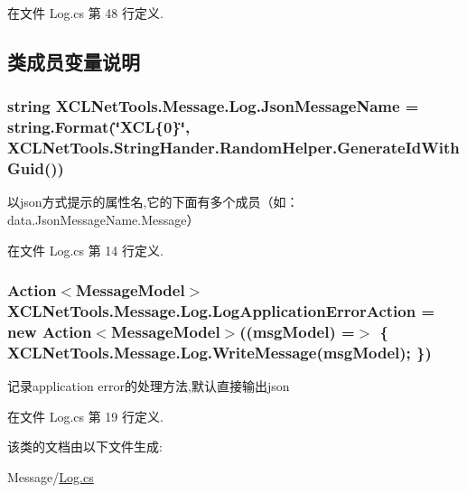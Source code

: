在文件 Log.\-cs 第 48 行定义.



\subsection{类成员变量说明}
\hypertarget{class_x_c_l_net_tools_1_1_message_1_1_log_ac9218999b3da2b5fbd7476e1ae47ca71}{
\subsubsection[{Json\-Message\-Name}]{\setlength{\rightskip}{0pt plus 5cm}string X\-C\-L\-Net\-Tools.\-Message.\-Log.\-Json\-Message\-Name = string.\-Format(\char`\"{}X\-C\-L\{0\}\char`\"{}, X\-C\-L\-Net\-Tools.\-String\-Hander.\-Random\-Helper.\-Generate\-Id\-With\-Guid())\hspace{0.3cm}{\ttfamily [static]}}}\label{class_x_c_l_net_tools_1_1_message_1_1_log_ac9218999b3da2b5fbd7476e1ae47ca71}


以json方式提示的属性名,它的下面有多个成员（如：data.\-Json\-Message\-Name.\-Message） 



在文件 Log.\-cs 第 14 行定义.

\hypertarget{class_x_c_l_net_tools_1_1_message_1_1_log_aeb571cf7294cbdc7776e44c5654b28d4}{
\subsubsection[{Log\-Application\-Error\-Action}]{\setlength{\rightskip}{0pt plus 5cm}Action$<${\bf Message\-Model}$>$ X\-C\-L\-Net\-Tools.\-Message.\-Log.\-Log\-Application\-Error\-Action = new Action$<${\bf Message\-Model}$>$((msg\-Model) =$>$ \{ {\bf X\-C\-L\-Net\-Tools.\-Message.\-Log.\-Write\-Message}(msg\-Model); \})\hspace{0.3cm}{\ttfamily [static]}}}\label{class_x_c_l_net_tools_1_1_message_1_1_log_aeb571cf7294cbdc7776e44c5654b28d4}


记录application error的处理方法,默认直接输出json 



在文件 Log.\-cs 第 19 行定义.



该类的文档由以下文件生成\-:\begin{DoxyCompactItemize}
\item 
Message/\hyperlink{_log_8cs}{Log.\-cs}\end{DoxyCompactItemize}
